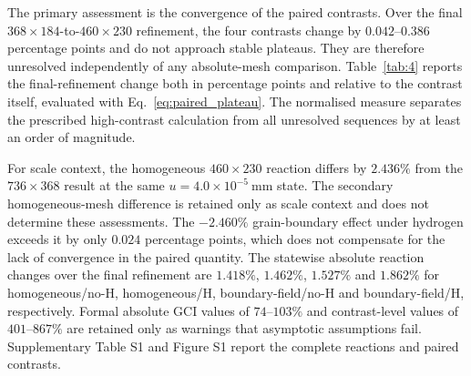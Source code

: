 \documentclass[preprint,12pt]{elsarticle}
\begin{document}
The primary assessment is the convergence of the paired contrasts. Over the final
\(368\times184\)-to-\(460\times230\) refinement, the four contrasts change by
\(0.042\)--\(0.386\) percentage points and do not approach stable plateaus. They
are therefore unresolved independently of any absolute-mesh comparison.
Table~\ref{tab:4} reports the final-refinement change both in percentage points and relative to the contrast itself, evaluated with Eq.~\eqref{eq:paired_plateau}. The normalised measure separates the prescribed high-contrast calculation from all unresolved sequences by at least an order of magnitude.
\begin{table}[t]
\centering
\caption{Final-refinement stability of paired reaction contrasts. Here $\Delta\delta_h=|\delta_h-\delta_{h^-}|$ and $\rho_h=\Delta\delta_h/|\delta_h|\times100\%$. Ranges for the prescribed fields span the DG0 and CG1 representations. Values of $\rho_h$ are computed from unrounded results and are therefore not exactly reproduced by the rounded entries of the two preceding columns.}
\label{tab:4}
\small
\setlength{\tabcolsep}{4pt}
\end{table}

For scale context, the homogeneous \(460\times230\) reaction differs by
\(2.436\%\) from the \(736\times368\) result at the same
\(u=4.0\times10^{-5}\ \mathrm{mm}\) state. The secondary homogeneous-mesh difference is retained only as scale context and does not determine these assessments. The \(-2.460\%\) grain-boundary effect under hydrogen
exceeds it by only \(0.024\) percentage points, which does not compensate for
the lack of convergence in the paired quantity. The statewise absolute reaction
changes over the final refinement are \(1.418\%\), \(1.462\%\), \(1.527\%\)
and \(1.862\%\) for homogeneous/no-H, homogeneous/H, boundary-field/no-H and
boundary-field/H, respectively. Formal absolute GCI values of \(74\)--\(103\%\)
and contrast-level values of \(401\)--\(867\%\) are retained only as warnings
that asymptotic assumptions fail. Supplementary Table S1 and Figure S1 report
the complete reactions and paired contrasts.
\end{document}
